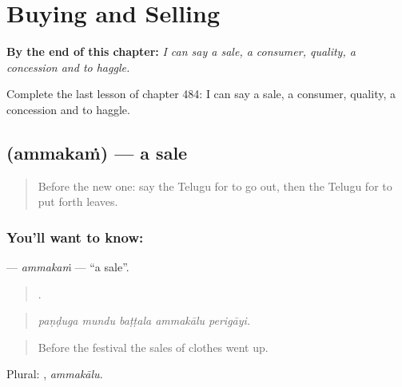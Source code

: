 
\chapter{Buying and Selling}
\label{ch:te-buying-and-selling}

\begin{chapteropening}
\textbf{By the end of this chapter:} \emph{I can say a sale, a consumer, quality, a concession and to haggle.}

Complete the last lesson of chapter 484: I can say a sale, a consumer, quality, a concession and to haggle.
\end{chapteropening}

\section[\texorpdfstring{\te{అమ్మకం} (ammakaṁ)}{అమ్మకం (ammakaṁ)}]{ (ammakaṁ) — a sale}

\label{lesson:TE-C484-ammakam}



\begin{quote}
Before the new one: say the Telugu for to go out, then the Telugu for to put forth leaves.
\end{quote}

\subsection*{You'll want to know: }
\textbf{} — \emph{ammakaṁ} — \textquotedblleft{}a sale\textquotedblright{}.

\begin{quote}
    .
\end{quote}

\begin{quote}
\emph{paṇḍuga mundu baṭṭala ammakālu perigāyi.}
\end{quote}

\begin{quote}
Before the festival the sales of clothes went up.
\end{quote}

Plural: , \emph{ammakālu}.

